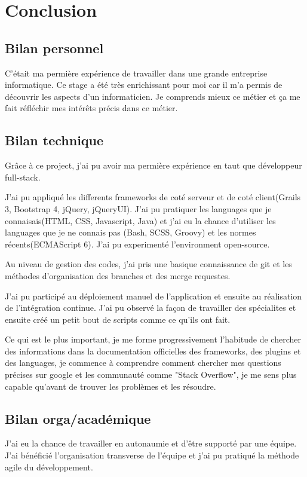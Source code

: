 \chapter{Conclusion}
\label{chap:Conclusion}

\section{Bilan personnel}
C'était ma permière expérience de travailler dans une grande entreprise informatique.
Ce stage a été très enrichissant pour moi car il m’a permis de découvrir les aspects d'un informaticien.
Je comprends mieux ce métier et ça me fait réfléchir mes intérêts précis dans ce métier.

\section{Bilan technique}
Grâce à ce project, j'ai pu avoir ma permière expérience en taut que développeur full-stack.

J'ai pu appliqué les differents frameworks de coté serveur et de coté client(Grails 3, Bootstrap 4, jQuery, jQueryUI).
J'ai pu pratiquer les languages que je connaisais(HTML, CSS, Javascript, Java)
et j'ai eu la chance d'utiliser les languages que je ne connais pas (Bash, SCSS, Groovy) et les normes récents(ECMAScript 6).
J'ai pu experimenté l'environment open-source.

Au niveau de gestion des codes, j'ai pris une basique connaissance de git et les méthodes d'organisation des branches et des merge requestes.

J'ai pu participé au déploiement manuel de l'application et ensuite au réalisation de l'intégration continue.
J'ai pu observé la façon de travailler des spécialites et ensuite créé un petit bout de scripts comme ce qu'ils ont fait.

Ce qui est le plus important,
je me forme progressivement l'habitude de chercher des informations dans la documentation officielles des frameworks, des plugins et des languages,
je commence à comprendre comment chercher mes questions précises sur google et les communauté comme "Stack Overflow",
je me sens plus capable qu'avant de trouver les problèmes et les résoudre.

\section{Bilan orga/académique}
J'ai eu la chance de travailler en autonaumie et d'être supporté par une équipe.
J'ai bénéficié l'organisation transverse de l'équipe et j'ai pu pratiqué la méthode agile du développement.
